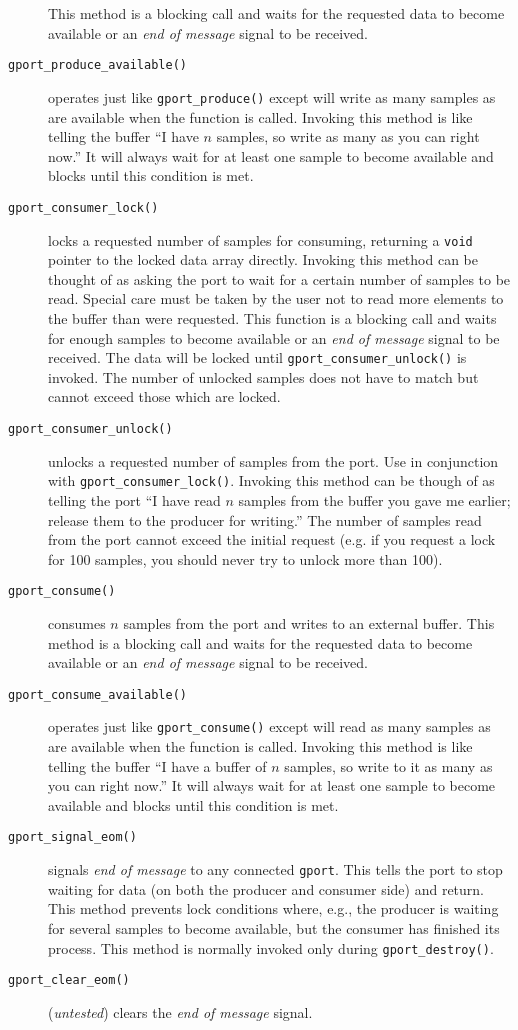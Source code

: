 \begin{description}
    This method is a blocking call and waits for the requested data to become
    available or an {\it end of message} signal to be received.
\item[{\tt gport\_produce\_available()}]
    operates just like {\tt gport\_produce()} except will write as many
    samples as are available when the function is called.
    Invoking this method is like telling the buffer ``I have $n$ samples, so
    write as many as you can right now.''
    It will always wait for at least one sample to become available and blocks
    until this condition is met.
\item[{\tt gport\_consumer\_lock()}]
    locks a requested number of samples for consuming, returning a {\tt void}
    pointer to the locked data array directly.
    Invoking this method can be thought of as asking the port to wait for a
    certain number of samples to be read.
    Special care must be taken by the user not to read more elements to the
    buffer than were requested.
    This function is a blocking call and waits for enough samples to become
    available or an {\it end of message} signal to be received.
    The data will be locked until {\tt gport\_consumer\_unlock()} is invoked.
    The number of unlocked samples does not have to match but cannot exceed
    those which are locked.
\item[{\tt gport\_consumer\_unlock()}]
    unlocks a requested number of samples from the port.
    Use in conjunction with {\tt gport\_consumer\_lock()}.
    Invoking this method can be though of as telling the port ``I have read
    $n$ samples from the buffer you gave me earlier; release them to the
    producer for writing.''
    The number of samples read from the port cannot exceed the initial
    request (e.g. if you request a lock for 100 samples, you should never try
    to unlock more than 100).
\item[{\tt gport\_consume()}]
    consumes $n$ samples from the port and writes to an external buffer.
    This method is a blocking call and waits for the requested data to become
    available or an {\it end of message} signal to be received.
\item[{\tt gport\_consume\_available()}]
    operates just like {\tt gport\_consume()} except will read as many samples
    as are available when the function is called.
    Invoking this method is like telling the buffer ``I have a buffer of $n$
    samples, so write to it as many as you can right now.''
    It will always wait for at least one sample to become available and blocks
    until this condition is met.
\item[{\tt gport\_signal\_eom()}]
    signals {\it end of message} to any connected {\tt gport}.
    This tells the port to stop waiting for data (on both the producer and
    consumer side) and return.
    This method prevents lock conditions where, e.g., the producer is waiting
    for several samples to become available, but the consumer has finished its
    process.
    This method is normally invoked only during {\tt gport\_destroy()}.
\item[{\tt gport\_clear\_eom()}]
    ({\it untested})
    clears the {\it end of message} signal.
\end{description}


